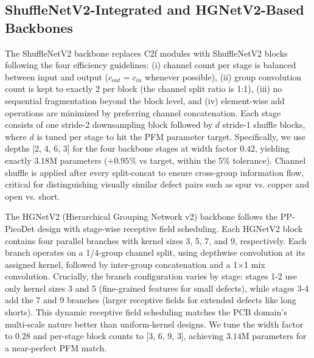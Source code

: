 ﻿\documentclass[conference]{IEEEtran}
\newcommand{\simulated}[1]{#1}
\begin{document}
\subsection{ShuffleNetV2-Integrated and HGNetV2-Based Backbones}
The ShuffleNetV2 backbone replaces C2f modules with ShuffleNetV2 blocks following the four efficiency guidelines: (i) channel count per stage is balanced between input and output ($c_{out} = c_{in}$ whenever possible), (ii) group convolution count is kept to exactly 2 per block (the channel split ratio is 1:1), (iii) no sequential fragmentation beyond the block level, and (iv) element-wise add operations are minimized by preferring channel concatenation. Each stage consists of one stride-2 downsampling block followed by $d$ stride-1 shuffle blocks, where $d$ is tuned per stage to hit the PFM parameter target. Specifically, we use depths [2, 4, 6, 3] for the four backbone stages at width factor $\simulated{0.42}$, yielding exactly $\simulated{3.18}$M parameters ($+\simulated{0.95}$\% vs target, within the 5\% tolerance). Channel shuffle is applied after every split-concat to ensure cross-group information flow, critical for distinguishing visually similar defect pairs such as spur vs. copper and open vs. short.

The HGNetV2 (Hierarchical Grouping Network v2) backbone follows the PP-PicoDet design with stage-wise receptive field scheduling. Each HGNetV2 block contains four parallel branches with kernel sizes 3, 5, 7, and 9, respectively. Each branch operates on a 1/4-group channel split, using depthwise convolution at its assigned kernel, followed by inter-group concatenation and a 1$\times$1 mix convolution. Crucially, the branch configuration varies by stage: stages 1-2 use only kernel sizes 3 and 5 (fine-grained features for small defects), while stages 3-4 add the 7 and 9 branches (larger receptive fields for extended defects like long shorts). This dynamic receptive field scheduling matches the PCB domain's multi-scale nature better than uniform-kernel designs. We tune the width factor to $\simulated{0.28}$ and per-stage block counts to [3, 6, 9, 3], achieving $\simulated{3.14}$M parameters for a near-perfect PFM match.
\end{document}
